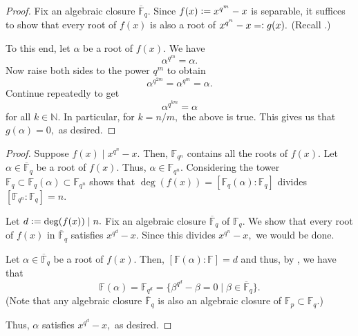 \xdxxnxdiv*\label{lem:xdxxnxdiv2}
\begin{flushright}\hyperref[lem:xdxxnxdiv]{\upsym}\end{flushright}
\begin{proof}
    Fix an algebraic closure $\overline{\mathbb{F}}_q.$ Since $f(x) \vcentcolon= x^{q^m} - x$ is separable, it suffices to show that every root of $f(x)$ is also a root of $x^{q^n} - x =\vcentcolon g(x).$ (Recall .)

    To this end, let $\alpha$ be a root of $f(x).$ We have 
    \begin{equation*} 
        \alpha^{q^m} = \alpha.
    \end{equation*}
    Now raise both sides to the power $q^m$ to obtain 
    \begin{equation*} 
        \alpha^{q^{2m}} = \alpha^{q^m} = \alpha.
    \end{equation*}
    Continue repeatedly to get 
    \begin{equation*} 
        \alpha^{q^{km}} = \alpha
    \end{equation*}
    for all $k \in \mathbb{N}.$ In particular, for $k = n/m,$ the above is true. This gives us that $g(\alpha) = 0,$ as desired.
\end{proof}

\irreddivsplitpoly*\label{lem:irreddivsplitpoly2}
\begin{flushright}\hyperref[lem:irreddivsplitpoly]{\upsym}\end{flushright}
\begin{proof}
    \forward Suppose $f(x) \mid x^{q^n} - x.$ Then, $\mathbb{F}_{q^n}$ contains all the roots of $f(x).$ Let $\alpha \in \overline{\mathbb{F}}_{q}$ be a root of $f(x).$ Thus, $\alpha \in \mathbb{F}_{q^n}.$ Considering the tower $\mathbb{F}_q \subset \mathbb{F}_q(\alpha) \subset \mathbb{F}_{q^n}$ shows that $\deg(f(x)) = [\mathbb{F}_q(\alpha) : \mathbb{F}_q]$ divides $[\mathbb{F}_{q^n} : \mathbb{F}_q] = n.$

    \backward Let $d \vcentcolon= \deg(f(x)) \mid n.$ Fix an algebraic closure $\overline{\mathbb{F}}_q$ of $\mathbb{F}_q.$ We show that every root of $f(x)$ in $\overline{\mathbb{F}}_q$ satisfies $x^{q^d} - x.$ Since this divides $x^{q^n} - x,$ we would be done.

    Let $\alpha \in \overline{\mathbb{F}}_q$ be a root of $f(x).$ Then, $[\mathbb{F}(\alpha) : \mathbb{F}] = d$ and thus, by , we have that
    \begin{equation*} 
        \mathbb{F}(\alpha) = \mathbb{F}_{q^d} = \{\beta^{q^d} - \beta = 0 \mid \beta \in \overline{\mathbb{F}}_q\}.
    \end{equation*}
    (Note that any algebraic closure $\overline{\mathbb{F}}_q$ is also an algebraic closure of $\mathbb{F}_p \subset \mathbb{F}_q.$)

    Thus, $\alpha$ satisfies $x^{q^d} - x,$ as desired.
\end{proof}

